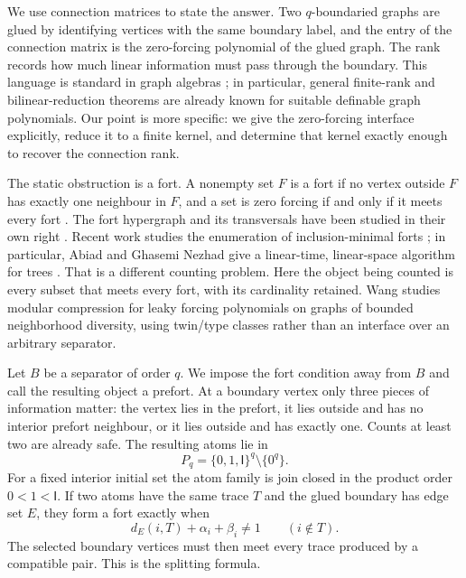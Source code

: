 \documentclass[11pt,reqno]{amsart}
\theoremstyle{definition}
\begin{document}
We use connection matrices to state the answer.  Two $q$-boundaried graphs are
glued by identifying vertices with the same boundary label, and the entry of
the connection matrix is the zero-forcing polynomial of the glued graph.  The
rank records how much linear information must pass through the boundary.  This
language is standard in graph algebras \cite{Lovasz2006,KotekMakowsky2014}; in
particular, general finite-rank and bilinear-reduction theorems are already
known for suitable definable graph polynomials.  Our point is more specific:
we give the zero-forcing interface explicitly, reduce it to a finite kernel,
and determine that kernel exactly enough to recover the connection rank.

The static obstruction is a fort.  A nonempty set $F$ is a fort if no vertex
outside $F$ has exactly one neighbour in $F$, and a set is zero forcing if and
only if it meets every fort \cite{AIM2008}.  The fort hypergraph and its
transversals have been studied in their own right
\cite{CameronHogbenEtAl2026}.  Recent work studies the enumeration of
inclusion-minimal forts \cite{BeckerEtAl2025,CameronLi2025,DatKenter2026}; in
particular, Abiad and Ghasemi Nezhad give a linear-time, linear-space algorithm
for trees \cite{AbiadGhasemiNezhad2026}.  That is a different counting problem.
Here the object being counted is every subset that meets every fort, with its
cardinality retained.  Wang \cite{Wang2026} studies modular compression for
leaky forcing polynomials on graphs of bounded neighborhood diversity, using
twin/type classes rather than an interface over an arbitrary separator.

Let $B$ be a separator of order $q$.  We impose the fort condition away from
$B$ and call the resulting object a prefort.  At a boundary vertex only three
pieces of information matter: the vertex lies in the prefort, it lies outside
and has no interior prefort neighbour, or it lies outside and has exactly one.
Counts at least two are already safe.  The resulting atoms lie in
\[
  P_q=\{0,1,\mathsf I\}^q\setminus\{0^q\}.
\]
For a fixed interior initial set the atom family is join closed in the product
order $0<1<\mathsf I$.  If two atoms have the same trace $T$ and the glued
boundary has edge set $E$, they form a fort exactly when
\[
  d_E(i,T)+\alpha_i+\beta_i\ne1\qquad(i\notin T).
\]
The selected boundary vertices must then meet every trace produced by a
compatible pair.  This is the splitting formula.
\end{document}
